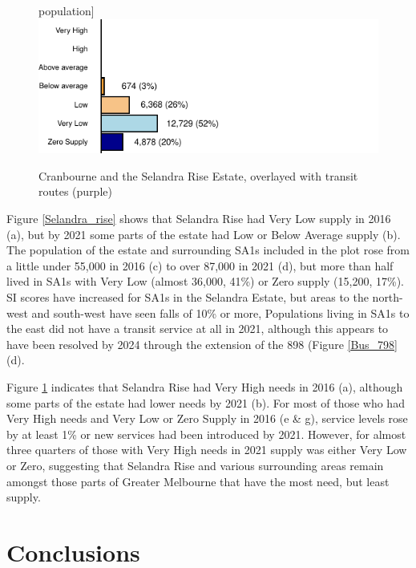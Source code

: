 \documentclass[preprint, 3p,
authoryear]{elsarticle} %
\begin{document}
\begin{figure}
population\label{fig:Selandra_rise_2021-8}]{\includegraphics{ReynoldsCurrieQu2024_files/figure-latex/Selandra_rise_2021-8} }\newline

\caption{Cranbourne and the Selandra Rise Estate, overlayed with transit routes (purple)}\label{fig:Selandra_rise_2021}
\end{figure}

Figure \ref{Selandra_rise} shows that Selandra Rise had Very Low supply
in 2016 (a), but by 2021 some parts of the estate had Low or Below
Average supply (b). The population of the estate and surrounding SA1s
included in the plot rose from a little under 55,000 in 2016 (c) to over
87,000 in 2021 (d), but more than half lived in SA1s with Very Low
(almost 36,000, 41\%) or Zero supply (15,200, 17\%). SI scores have
increased for SA1s in the Selandra Estate, but areas to the north-west
and south-west have seen falls of 10\% or more, Populations living in
SA1s to the east did not have a transit service at all in 2021, although
this appears to have been resolved by 2024 through the extension of the
898 (Figure \ref{Bus_798}(d).

Figure \ref{fig:Selandra_rise_2021} indicates that Selandra Rise had
Very High needs in 2016 (a), although some parts of the estate had lower
needs by 2021 (b). For most of those who had Very High needs and Very
Low or Zero Supply in 2016 (e \& g), service levels rose by at least 1\%
or new services had been introduced by 2021. However, for almost three
quarters of those with Very High needs in 2021 supply was either Very
Low or Zero, suggesting that Selandra Rise and various surrounding areas
remain amongst those parts of Greater Melbourne that have the most need,
but least supply.

\section{Conclusions}\label{conclusions}
\end{document}
